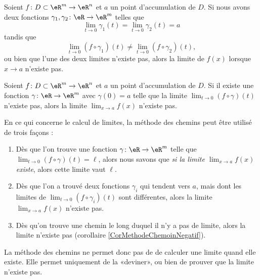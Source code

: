 \begin{corollary}	\label{CorMethodeChemin}
	Soient $f\colon D\subset\eR^m\to \eR^n$ et $a$ un point d'accumulation de $D$. Si nous avons deux fonctions $\gamma_1,\gamma_2\colon \eR\to \eR^m$ telles que
	\begin{equation}
		\lim_{t\to 0} \gamma_1(t)=\lim_{t\to 0} \gamma_2(t)=a
	\end{equation}
	tandis que
	\begin{equation}
		\lim_{t\to 0} (f\circ \gamma_1)(t)\neq\lim_{t\to 0} (f\circ \gamma_2)(t),
	\end{equation}
	ou bien que l'une des deux limites n'existe pas, alors la limite de $f(x)$ lorsque $x\to a$ n'existe pas.
\end{corollary}

\begin{corollary}	\label{CorMethodeChemoinNegatif}
	Soient $f\colon D\subset\eR^m\to \eR^n$ et $a$ un point d'accumulation de $D$. Si il existe une fonction $\gamma\colon \eR\to \eR^m$ avec $\gamma(0)=a$ telle que la limite $\lim_{t\to 0} (f\circ\gamma)(t)$ n'existe pas, alors la limite $\lim_{x\to a} f(x)$ n'existe pas.
\end{corollary}

En ce qui concerne le calcul de limites, la méthode des chemins peut être utilisé de trois façons :
\begin{enumerate}
	\item
		Dès que l'on trouve une fonction $\gamma\colon \eR\to \eR^m$ telle que $\lim_{t\to 0} (f\circ \gamma)(t)=\ell$, alors nous savons que \emph{si la limite $\lim_{x\to a} f(x)$ existe}, alors cette limite vaut $\ell$.
	\item
		Dès que l'on a trouvé deux fonctions $\gamma_i$ qui tendent vers $a$, mais dont les limites de $\lim_{t\to 0} (f\circ\gamma_i)(t)$ sont différentes, alors la limite $\lim_{x\to a} f(x)$ n'existe pas.
	\item
		Dès qu'on trouve une chemin le long duquel il n'y a pas de limite, alors la limite n'existe pas (corollaire \ref{CorMethodeChemoinNegatif}).
\end{enumerate}
La méthode des chemins ne permet donc pas de de calculer une limite quand elle existe. Elle permet uniquement de la «deviner», ou bien de prouver que la limite n'existe pas.

